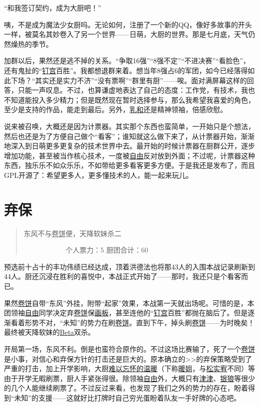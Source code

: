  “和我签订契约，成为大厨吧！”

咦，不是成为魔法少女厨吗。无论如何，注册了一个新的QQ，像好多故事的开头一样，被莫名其妙卷入了另一个世界——日萌，大厨的世界。那是七月底，天气仍然燥热的季节。

加群以后，果然还是逃不掉的关系。“争取16强”“8强不定”“不进决赛”“看脸色”，还有鬼扯的“\uline{钉宫}百胜”。我都想退群来着。想当年8强占6的军团，如今已经落得如此下场？“其实还是实力不济”“没有票啊”“群里有厨”——唉。面对满屏幕这样的回答，只能一声叹息。不过，也算谦虚地表达了自己的态度：工作党，有技术，我也不知道能投入多少精力；但是既然现在暂时选择参与，那么我希望我喜爱的角色，至少是支持的作品，能走到最后。另外，\uline{乳和}还是精神领袖，倍感欣慰。

说来被召唤，大概还是因为计票器。其实那个东西也蛮简单，一开始只是个想法，然后也还是为了方便自己做个“看客”；谁知就这么做下来了，从计票器开始，渐渐地深入到日萌更多更复杂的技术世界中去。最开始的时候计票器在厨群公开，逐步增加功能，甚至被当作核心技术，一度被\uline{自由}反对放到外面；不过呢，计票器这种东西，独乐乐不如众乐乐，不如带给更多看客更多方便。于是我还是发布了，而且GPL开源了：希望更多人，更多懂技术的人，能一起来玩儿。

\chapter{弃保}
\begin{quote}
东风不与\uline{卷饼}便，天降软妹杀二

　　　　　　个人票力：5 厨团合计：60
\end{quote}

预选前十占十的丰功伟绩已经达成，顶着洪德法也将那43人的入围本战记录刷新到44人。厨还沉浸在胜利的喜悦中，本战正式开始了——那时，我还只是个看客而已。

果然\uline{卷饼}自带“东风”外挂，附带“起家”效果，本战第一天就出场呢。可惜的是，本团领袖\uline{自由}同学决定弃\uline{卷饼}保\uline{画板}，甚至连他的“\uline{钉宫}百胜”都抛在脑后了。但是逐渐看着形势不对，“未知”的势力在刷\uline{卷饼}。直到下午，掉头刷\uline{卷饼}——为时晚矣！最终被天降软妹的\uline{Beta}双杀。

开局第一场，东风不利。倒是也蛮符合原作的。不过这场比赛输了，死了一个\uline{卷饼}是小事，对信心和弃保方针的打击还是巨大的。原本确立的>>的弃保策略受到了严重的打击，加上开学影响，大厨\uline{难以忘怀的温暖}（下称\uline{暖姐}，与\uline{松实宥}不同）等由于开学无暇刷票，厨人手紧张得很。除领袖\uline{自由}外，大概只有\uline{津津}、\uline{银狼}等很少的几个人能继续刷票了。不过反过来看，也发现了我们之外的势力的存在，盼着得到“未知”的支援——这就好比打牌时自己穷光蛋盼着队友一手好牌的心态吧。

